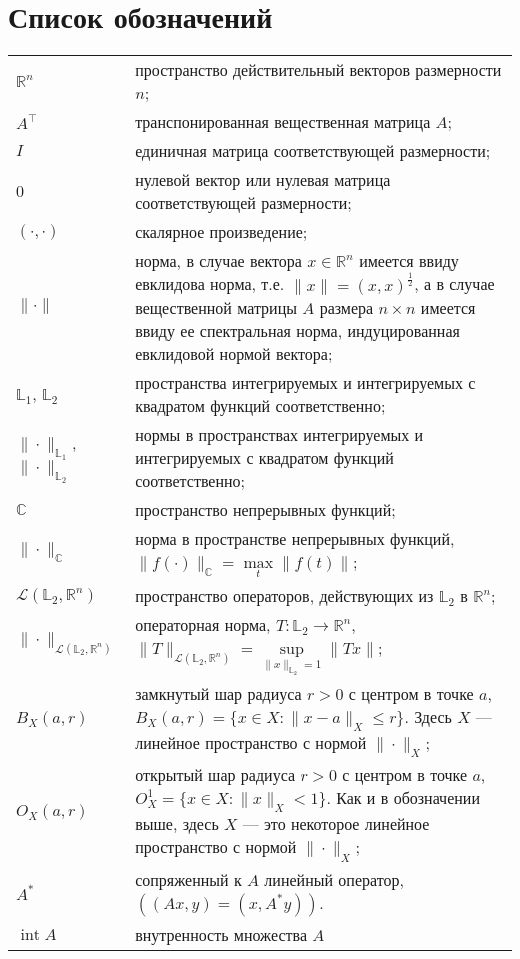 \documentclass[../main.tex]{subfiles}
\begin{document}
\clearpage
\section*{Список обозначений}
\begin{tabularx}{\textwidth}{lY}
    $\mathbb{R}^n$ & пространство действительный векторов размерности $n$; \\ 
    $A^{\top}$ & транспонированная вещественная матрица $A$; \\ 
    $I$ & единичная матрица соответствующей размерности; \\ 
    $0$ & нулевой вектор или нулевая матрица соответствующей размерности; \\
    $(\cdot,\cdot)$ & скалярное произведение; \\
    $\| \cdot\| $ &  норма, в случае вектора $x \in \mathbb{R}^n$ имеется ввиду евклидова норма,  т.е. $\|x\| = (x,x)^{\frac{1}{2}}$, а в случае вещественной  матрицы $A$ размера $n \times n$ имеется ввиду ее спектральная норма, индуцированная евклидовой нормой вектора; \\
    $\mathbb{L}_1$, $\mathbb{L}_2$ & пространства интегрируемых и интегрируемых с квадратом функций соответственно; \\
    $\|\cdot\|_{\mathbb{L}_1}$, $\|\cdot\|_{\mathbb{L}_2}$ & нормы в пространствах интегрируемых и интегрируемых с квадратом функций соответственно; \\
    $ \mathbb{C} $ & пространство непрерывных функций; \\
    $\|\cdot\|_\mathbb{C}$ & норма в пространстве непрерывных функций, $\|f(\cdot) \|_\mathbb{C} = \max\limits_{t} \|f(t)\|$; \\
    $\mathcal{L}(\mathbb{L}_2, \mathbb{R}^n)$ & пространство операторов, действующих из $\mathbb{L}_2$ в  $\mathbb{R}^n$; \\ 
    $\| \cdot \|_{\mathcal{L}(\mathbb{L}_2, \mathbb{R}^n)}$ &  операторная норма, $T:  \mathbb{L}_2 \to \mathbb{R}^n $, $\| T \|_{\mathcal{L}(\mathbb{L}_2, \mathbb{R}^n)} = \sup\limits_{\|x\|_{\mathbb{L}_2} = 1} \| T x \| $;\\
    $B_X(a,r)$ & замкнутый шар радиуса $r>0$ с центром в точке $a$, $B_X(a, r) = \{x\in X: \|x-a\|_X \leqslant r \}$. Здесь $X$ --- линейное пространство с нормой $\|\cdot\|_X$; \\
    $O_{X}(a, r)$  & открытый шар радиуса $r>0$ с центром в точке $a$, $O_{X}^1 = \{x\in X: \|x\|_{X} < 1 \}$. Как и в обозначении выше, здесь $X$ --- это некоторое линейное пространство с нормой $\|\cdot\|_X$; \\
    $ A^* $ & сопряженный к $A$ линейный оператор, $((Ax, y) = (x, A^*y))$. \\
    $ \operatorname{int}A $   & внутренность множества $A$ \\
\end{tabularx}
\end{document}
